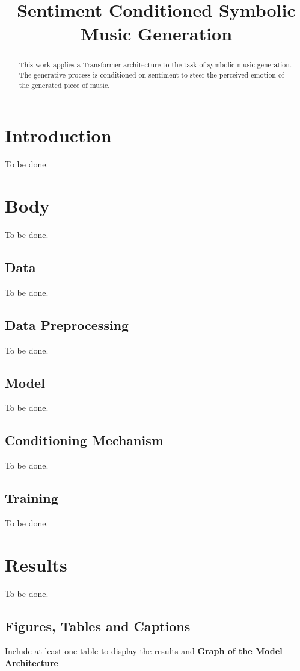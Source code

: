 \documentclass{article}
\title{Sentiment Conditioned Symbolic Music Generation}
\begin{document}
\maketitle

\begin{abstract}
This work applies a Transformer architecture to the task of symbolic music generation. The generative process is conditioned on sentiment to steer the perceived emotion of the generated piece of music.
\end{abstract}

\section{Introduction}\label{sec:introduction}
To be done.
\section{Body}
To be done.

\subsection{Data}\label{subsec:data}
To be done.

\subsection{Data Preprocessing}\label{subsec:data_prep}
To be done.

\subsection{Model}\label{subsec:model}
To be done.

\subsection{Conditioning Mechanism}\label{subsec:cond}
To be done.

\subsection{Training}\label{subsec:training}
To be done.

\section{Results}\label{sec:results}
To be done.

\subsection{Figures, Tables and Captions}
Include at least one table to display the results and \textbf{Graph of the Model Architecture}
\end{document}

